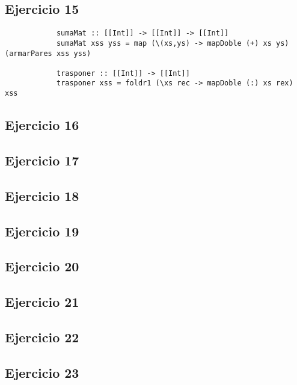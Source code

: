 \subsection{Ejercicio 15}
	\begin{centrado}
		\begin{verbatim}
			sumaMat :: [[Int]] -> [[Int]] -> [[Int]]
			sumaMat xss yss = map (\(xs,ys) -> mapDoble (+) xs ys) (armarPares xss yss)
			
			trasponer :: [[Int]] -> [[Int]]
			trasponer xss = foldr1 (\xs rec -> mapDoble (:) xs rex) xss
		\end{verbatim}
	\end{centrado}

\subsection{Ejercicio 16}
\subsection{Ejercicio 17}
\subsection{Ejercicio 18}
\subsection{Ejercicio 19}
\subsection{Ejercicio 20}
\subsection{Ejercicio 21}
\subsection{Ejercicio 22}
\subsection{Ejercicio 23}
